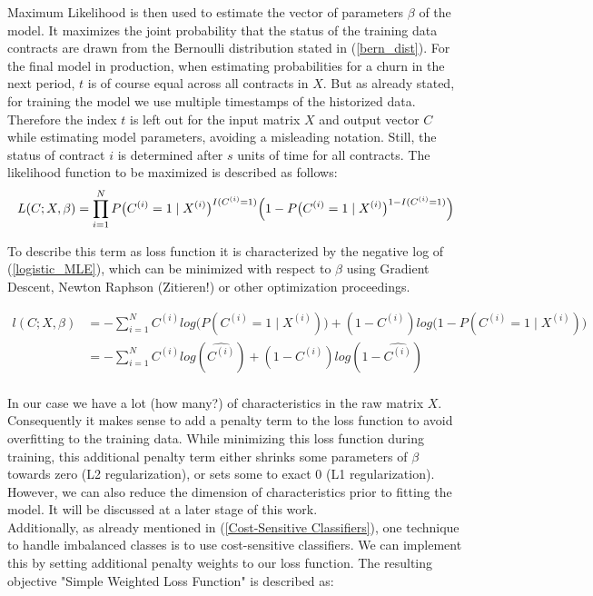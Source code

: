 \documentclass[12pt,titlepage]{article}
\begin{document}
Maximum Likelihood is then used to estimate the vector of parameters $\beta$ of the model. It maximizes the joint probability that the status of the training data contracts are drawn from the Bernoulli distribution stated in (\ref{bern_dist}). For the final model in production, when estimating probabilities for a churn in the next period, $t$ is of course equal across all contracts in $X$. But as already stated, for training the model we use multiple timestamps of the historized data. Therefore the index $t$ is left out for the input matrix $X$ and output vector $C$ while estimating model parameters, avoiding a misleading notation. Still, the status of contract $i$ is determined after $s$ units of time for all contracts. The likelihood function to be maximized is described as follows: \\

\begin{equation} \label{logistic_MLE}
    L(C; X, \beta) = \prod_{i=1}^{N}P\big(C^{(i)}=1\mid X^{(i)}\big)^{I(C^{(i)}=1)}\Big(1 - P\big(C^{(i)}=1\mid X^{(i)}\big)^{1 - I(C^{(i)}=1)}\Big) \\
\end{equation}

To describe this term as loss function it is characterized by the negative log of (\ref{logistic_MLE}), which can be minimized with respect to $\beta$ using Gradient Descent, Newton Raphson (Zitieren!) or other optimization proceedings.

\begin{equation} \label{logistic_log_MLE}
    \begin{aligned}
        l(C; X, \beta) & = -\sum_{i=1}^{N}C^{(i)}log\big(P(C^{(i)}=1\mid X^{(i)})\big) + (1 - C^{(i)})log\big(1 - P(C^{(i)}=1\mid  X^{(i)})\big) \\
        & = -\sum_{i=1}^{N}C^{(i)}log(\widehat{C^{(i)}}) + (1 - C^{(i)})log(1 - \widehat{C^{(i)}}) \\
    \end{aligned}
\end{equation}

In our case we have a lot (how many?) of characteristics in the raw matrix $X$. Consequently it makes sense to add a penalty term to the loss function to avoid overfitting to the training data. While minimizing this loss function during training, this additional penalty term either shrinks some parameters of $\beta$ towards zero (L2 regularization), or sets some to exact 0 (L1 regularization). However, we can also reduce the dimension of characteristics prior to fitting the model. It will be discussed at a later stage of this work. \\
Additionally, as already mentioned in (\ref{Cost-Sensitive Classifiers}), one technique to handle imbalanced classes is to use cost-sensitive classifiers. We can implement this by setting additional penalty weights to our loss function. The resulting objective "Simple Weighted Loss Function" is described as:\\
\end{document}
